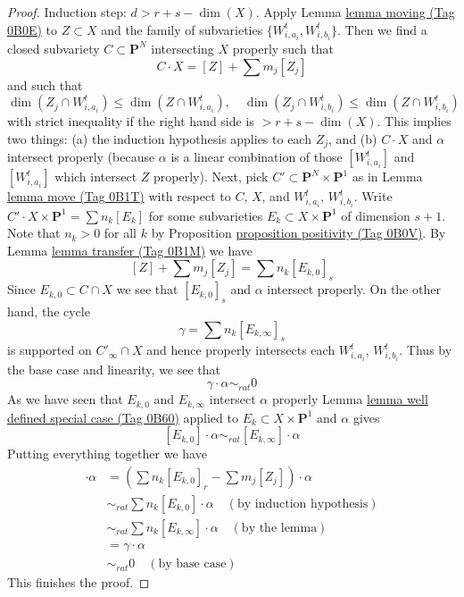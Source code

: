 \documentclass{amsart}
\theoremstyle{plain}
\theoremstyle{definition}
\theoremstyle{remark}
\numberwithin{equation}{subsection}
\begin{document}
\begin{proof}
\medskip\noindent
Induction step: $d >  r + s - \dim(X)$. Apply
Lemma \href{https://stacks.math.columbia.edu/tag/0B0E}{lemma moving (Tag 0B0E)} to $Z \subset X$ and
the family of subvarieties $\{W_{i, a_i}^t, W_{i, b_i}^t\}$. Then we find a
closed subvariety $C \subset \mathbf{P}^N$ intersecting $X$
properly such that
$$
C \cdot X = [Z] + \sum m_j [Z_j]
$$
and such that
$$
\dim(Z_j \cap W_{i, a_i}^t) \leq \dim(Z \cap W_{i, a_i}^t),\quad
\dim(Z_j \cap W_{i, b_i}^t) \leq \dim(Z \cap W_{i, b_i}^t)
$$
with strict inequality if the right hand side is $> r + s - \dim(X)$.
This implies two things: (a) the induction hypothesis applies to
each $Z_j$, and (b) $C \cdot X$ and $\alpha$ intersect properly (because
$\alpha$ is a linear combination of those $[W_{i, a_i}^t]$ and
$[W_{i, a_i}^t]$ which intersect $Z$ properly).
Next, pick $C' \subset \mathbf{P}^N \times \mathbf{P}^1$
as in Lemma \href{https://stacks.math.columbia.edu/tag/0B1T}{lemma move (Tag 0B1T)} with respect to $C$, $X$, and
$W_{i, a_i}^t$, $W_{i, b_i}^t$.
Write $C' \cdot X \times \mathbf{P}^1 = \sum n_k [E_k]$ for
some subvarieties $E_k \subset X \times \mathbf{P}^1$ of
dimension $s + 1$. Note that $n_k > 0$ for all $k$ by
Proposition \href{https://stacks.math.columbia.edu/tag/0B0V}{proposition positivity (Tag 0B0V)}.
By Lemma \href{https://stacks.math.columbia.edu/tag/0B1M}{lemma transfer (Tag 0B1M)} we have
$$
[Z] + \sum m_j [Z_j] = \sum n_k[E_{k, 0}]_s
$$
Since $E_{k, 0} \subset C \cap X$ we see that $[E_{k, 0}]_s$ and $\alpha$
intersect properly. On the other hand, the cycle
$$
\gamma = \sum n_k[E_{k, \infty}]_s
$$
is supported on $C'_\infty \cap X$ and hence
properly intersects each $W_{i, a_i}^t$, $W_{i, b_i}^t$.
Thus by the base case and linearity, we see that
$$
\gamma \cdot \alpha \sim_{rat} 0
$$
As we have seen that $E_{k, 0}$ and $E_{k, \infty}$
intersect $\alpha$ properly Lemma \href{https://stacks.math.columbia.edu/tag/0B60}{lemma well defined special case (Tag 0B60)}
applied to $E_k \subset X \times \mathbf{P}^1$ and $\alpha$ gives
$$
[E_{k, 0}] \cdot \alpha \sim_{rat} [E_{k, \infty}] \cdot \alpha
$$
Putting everything together we have
\begin{align*}
[Z] \cdot \alpha
& =
(\sum n_k[E_{k, 0}]_r - \sum m_j[Z_j]) \cdot \alpha \\
& \sim_{rat}
\sum n_k [E_{k, 0}] \cdot \alpha \quad (\text{by induction hypothesis})\\
& \sim_{rat}
\sum n_k [E_{k, \infty}] \cdot \alpha \quad (\text{by the lemma})\\
& =
\gamma \cdot \alpha \\
& \sim_{rat}
0 \quad (\text{by base case})
\end{align*}
This finishes the proof.
\end{proof}
\end{document}
